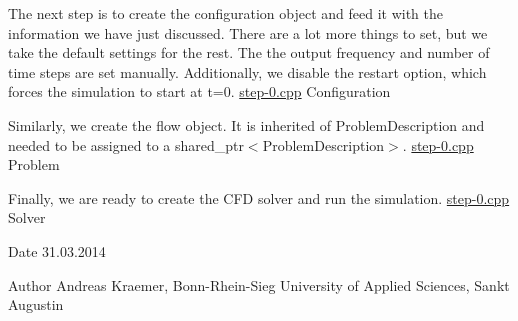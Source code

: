 The next step is to create the configuration object and feed it with the information we have just discussed. There are a lot more things to set, but we take the default settings for the rest. The the output frequency and number of time steps are set manually. Additionally, we disable the restart option, which forces the simulation to start at t=0.  \hyperlink{step-0_8cpp}{step-\/0.cpp} Configuration

Similarly, we create the flow object. It is inherited of ProblemDescription and needed to be assigned to a shared\_\-ptr$<$ProblemDescription$>$.  \hyperlink{step-0_8cpp}{step-\/0.cpp} Problem

Finally, we are ready to create the CFD solver and run the simulation.  \hyperlink{step-0_8cpp}{step-\/0.cpp} Solver

\begin{DoxyDate}{Date}
31.03.2014 
\end{DoxyDate}
\begin{DoxyAuthor}{Author}
Andreas Kraemer, Bonn-\/Rhein-\/Sieg University of Applied Sciences, Sankt Augustin
\end{DoxyAuthor}

